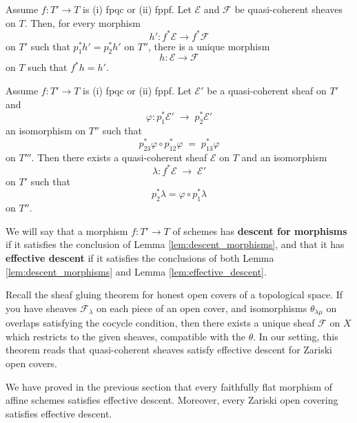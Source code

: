 \documentclass[12pt]{article}
\begin{document}
\begin{lemma}\label{lem:descent_morphisms}
Assume $f : T' \to T$ is (i) fpqc or (ii) fppf. 
Let $\mathcal{E}$ and $\mathcal{F}$ be quasi-coherent sheaves on $T$. 
Then, for every morphism 
\[
h' : f^*\mathcal{E} \to f^*\mathcal{F}
\]
on $T'$ such that $p_1^*h' = p_2^*h'$ on $T''$, there is a unique morphism 
\[
h : \mathcal{E} \to \mathcal{F}
\]
on $T$ such that $f^*h = h'$.
\end{lemma}

\begin{lemma}\label{lem:effective_descent}
Assume $f : T' \to T$ is (i) fpqc or (ii) fppf. 
Let $\mathcal{E}'$ be a quasi-coherent sheaf on $T'$ and 
\[
\varphi : p_1^*\mathcal{E}' \;\longrightarrow\; p_2^*\mathcal{E}'
\]
an isomorphism on $T''$ such that 
\[
p_{23}^*\varphi \circ p_{12}^*\varphi \;=\; p_{13}^*\varphi
\]
on $T'''$. Then there exists a quasi-coherent sheaf $\mathcal{E}$ on $T$ 
and an isomorphism 
\[
\lambda : f^*\mathcal{E} \;\longrightarrow\; \mathcal{E}'
\]
on $T'$ such that 
\[
p_2^*\lambda = \varphi \circ p_1^*\lambda
\]
on $T''$.
\end{lemma}

We will say that a morphism $f : T' \to T$ of schemes has \textbf{descent for morphisms} if it satisfies the conclusion of Lemma \ref{lem:descent_morphisms}, and that it has \textbf{effective descent} if it satisfies the conclusions of both Lemma \ref{lem:descent_morphisms} and Lemma \ref{lem:effective_descent}.

Recall the sheaf gluing theorem for honest open covers of a topological space. If you have sheaves $\mathcal{F}_\lambda$ on each piece of an open cover, and isomorphisms $\theta_{\lambda\mu}$ on overlaps satisfying the cocycle condition, then there exists a unique sheaf $\mathcal{F}$ on $X$ which restricts to the given sheaves, compatible with the $\theta$. In our setting, this theorem reads that quasi-coherent sheaves satisfy effective descent for Zariski open covers. 

We have proved in the previous section that every faithfully flat morphism of affine schemes satisfies effective descent. Moreover, every Zariski open covering satisfies effective descent.
\end{document}
